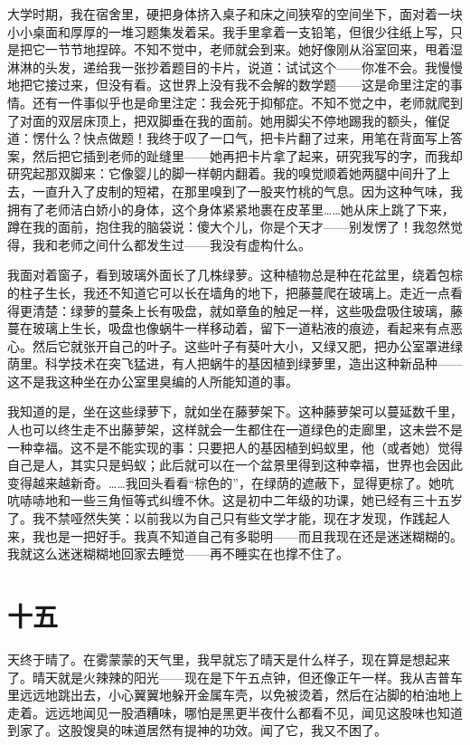 大学时期，我在宿舍里，硬把身体挤入桌子和床之间狭窄的空间坐下，面对着一块小小桌面和厚厚的一堆习题集发着呆。我手里拿着一支铅笔，但很少往纸上写，只是把它一节节地捏碎。不知不觉中，老师就会到来。她好像刚从浴室回来，甩着湿淋淋的头发，递给我一张抄着题目的卡片，说道：试试这个——你准不会。我慢慢地把它接过来，但没有看。这世界上没有我不会解的数学题——这是命里注定的事情。还有一件事似乎也是命里注定：我会死于抑郁症。不知不觉之中，老师就爬到了对面的双层床顶上，把双脚垂在我的面前。她用脚尖不停地踢我的额头，催促道：愣什么？快点做题！我终于叹了一口气，把卡片翻了过来，用笔在背面写上答案，然后把它插到老师的趾缝里——她再把卡片拿了起来，研究我写的字，而我却研究起那双脚来：它像婴儿的脚一样朝内翻着。我的嗅觉顺着她两腿中间升了上去，一直升入了皮制的短裙，在那里嗅到了一股夹竹桃的气息。因为这种气味，我拥有了老师洁白娇小的身体，这个身体紧紧地裹在皮革里……她从床上跳了下来，蹲在我的面前，抱住我的脑袋说：傻大个儿，你是个天才——别发愣了！我忽然觉得，我和老师之间什么都发生过——我没有虚构什么。 

我面对着窗子，看到玻璃外面长了几株绿萝。这种植物总是种在花盆里，绕着包棕的柱子生长，我还不知道它可以长在墙角的地下，把藤蔓爬在玻璃上。走近一点看得更清楚：绿萝的蔓条上长有吸盘，就如章鱼的触足一样，这些吸盘吸住玻璃，藤蔓在玻璃上生长，吸盘也像蜗牛一样移动着，留下一道粘液的痕迹，看起来有点恶心。然后它就张开自己的叶子。这些叶子有葵叶大小，又绿又肥，把办公室罩进绿荫里。科学技术在突飞猛进，有人把蜗牛的基因植到绿萝里，造出这种新品种——这不是我这种坐在办公室里臭编的人所能知道的事。 

我知道的是，坐在这些绿萝下，就如坐在藤萝架下。这种藤萝架可以蔓延数千里，人也可以终生走不出藤萝架，这样就会一生都住在一道绿色的走廊里，这未尝不是一种幸福。这不是不能实现的事：只要把人的基因植到蚂蚁里，他（或者她）觉得自己是人，其实只是蚂蚁；此后就可以在一个盆景里得到这种幸福，世界也会因此变得越来越新奇。……我回头看看“棕色的”，在绿荫的遮蔽下，显得更棕了。她吭吭哧哧地和一些三角恒等式纠缠不休。这是初中二年级的功课，她已经有三十五岁了。我不禁哑然失笑：以前我以为自己只有些文学才能，现在才发现，作践起人来，我也是一把好手。我真不知道自己有多聪明——而且我现在还是迷迷糊糊的。我就这么迷迷糊糊地回家去睡觉——再不睡实在也撑不住了。 
\section*{十五} 

天终于晴了。在雾蒙蒙的天气里，我早就忘了晴天是什么样子，现在算是想起来了。晴天就是火辣辣的阳光——现在是下午五点钟，但还像正午一样。我从吉普车里远远地跳出去，小心翼翼地躲开金属车壳，以免被烫着，然后在沾脚的柏油地上走着。远远地闻见一股酒糟味，哪怕是黑更半夜什么都看不见，闻见这股味也知道到家了。这股馊臭的味道居然有提神的功效。闻了它，我又不困了。 

